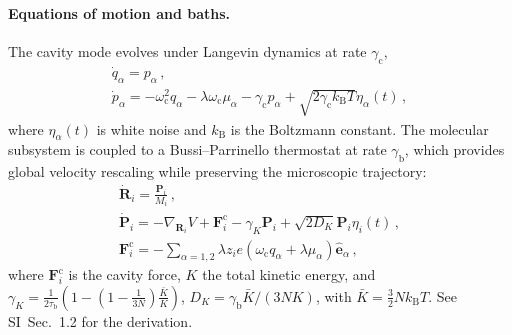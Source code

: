 \documentclass[aps, prl,
 reprint,
 superscriptaddress,
 citeautoscript,
 amsmath,amssymb,
 tightenlines
]{revtex4-2}
\begin{document}
\paragraph*{Equations of motion and baths.} 
The cavity mode evolves under Langevin dynamics at rate $\gamma_\mathrm{c}$,
\begin{gather}
\dot{q}_{\alpha} = p_\alpha \label{eq:langevin_cavity_1} \,, \\ 
\dot{p}_\alpha = -\omega_\mathrm{c}^2 q_\alpha - \lambda \omega_\mathrm{c} \mu_\alpha -\gamma_\mathrm{c} p_\alpha +\sqrt{2 \gamma_\mathrm{c} k_\mathrm{B} T } \eta_\alpha(t)  \,, \label{eq:langevin_cavity_2}
\end{gather}
where $\eta_\alpha(t)$ is white noise and $k_\mathrm{B}$ is the Boltzmann constant.
The molecular subsystem is coupled to a Bussi–Parrinello thermostat\cite{bussi2007canonical,bussi2008stochastic} at rate $\gamma_\mathrm{b}$, which provides global velocity rescaling while preserving the microscopic trajectory:
\begin{gather}
\dot{\bm{R}}_i = \frac{\bm{P}_i}{M_i} \,, \label{eq:bussi_mol_1} \\
\dot{\bm{P}}_i = -\nabla_{\bm{R}_i} V +\bm F_i^\mathrm{c}  -\gamma_K \bm P_i + \sqrt{2 D_K} \bm P_i \eta_i (t) \,, \label{eq:bussi_mol_2}
\\
\bm F_i^\mathrm{c} = - \sum_{\alpha=1,2} \lambda z_i e \left(\omega_\mathrm{c} q_\alpha + \lambda \mu_\alpha \right)\hat{\bm e}_\alpha \,,
\end{gather}
where $\bm F_i^\mathrm{c}$ is the cavity force, $K$ the total kinetic energy, and $\gamma_K = \frac{1}{2\tau_\mathrm{b}} \left(1-\left(1-\frac{1}{3 N}\right) \frac{\bar{K}}{K}\right)$, $D_K = \gamma_\mathrm{b} \bar{K} / (3 N  K)$, with $\bar{K} = \frac{3}{2}Nk_\mathrm{B} T$. See SI~Sec.~1.2 for the derivation.
\end{document}
